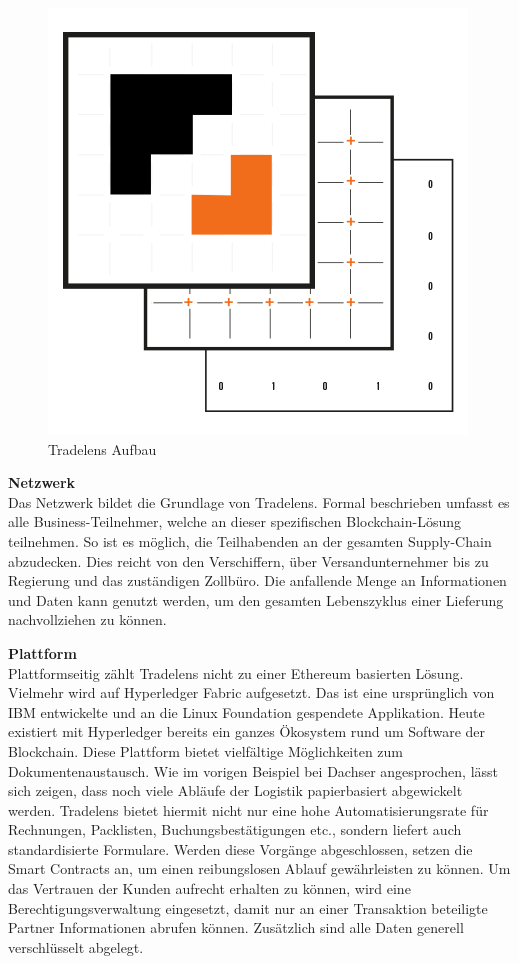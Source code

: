 \begin{figure}[h!]
  \centering
  \includegraphics[width=.4\textwidth]{Bilder/Tradelens-Overview.png}
  \caption[Tradelens Aufbau]{Tradelens Aufbau \cite{Tradelens2019a}}
  \label{fig:tradelensOverview}
\end{figure}

\textbf{Netzwerk}\\
Das Netzwerk bildet die Grundlage von Tradelens. Formal beschrieben umfasst es alle Business-Teilnehmer, welche an dieser spezifischen Blockchain-Lösung teilnehmen. So ist es möglich, die Teilhabenden an der gesamten Supply-Chain abzudecken. Dies reicht von den Verschiffern, über Versandunternehmer bis zu Regierung und das zuständigen Zollbüro. Die anfallende Menge an Informationen und Daten kann genutzt werden, um den gesamten Lebenszyklus einer Lieferung nachvollziehen zu können. \cite[vgl.][S. 5]{Tradelens2019b}

\textbf{Plattform}\\
Plattformseitig zählt Tradelens nicht zu einer Ethereum basierten Lösung. Vielmehr wird auf Hyperledger Fabric aufgesetzt. Das ist eine ursprünglich von IBM entwickelte und an die Linux Foundation gespendete Applikation. Heute existiert mit Hyperledger bereits ein ganzes Ökosystem rund um Software der Blockchain. Diese Plattform bietet vielfältige Möglichkeiten zum Dokumentenaustausch. Wie im vorigen Beispiel bei Dachser angesprochen, lässt sich zeigen, dass noch viele Abläufe der Logistik papierbasiert abgewickelt werden. Tradelens bietet hiermit nicht nur eine hohe Automatisierungsrate für Rechnungen, Packlisten, Buchungsbestätigungen etc., sondern liefert auch standardisierte Formulare. Werden diese Vorgänge abgeschlossen, setzen die Smart Contracts an, um einen reibungslosen Ablauf gewährleisten zu können. Um das Vertrauen der Kunden aufrecht erhalten zu können, wird eine Berechtigungsverwaltung eingesetzt, damit nur an einer Transaktion beteiligte Partner Informationen abrufen können. Zusätzlich sind alle Daten generell verschlüsselt abgelegt. \cite[vgl.][S. 11 ff.]{Tradelens2019b}

